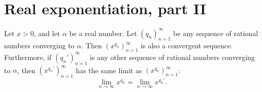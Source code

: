 \section{Real exponentiation, part II}\label{i:sec:6.7}

\begin{lem}\label{i:6.7.1}
  Let \(x > 0\), and let \(\alpha\) be a real number.
  Let \((q_n)_{n = 1}^\infty\) be any sequence of rational numbers converging to \(\alpha\).
  Then \((x^{q_n})_{n = 1}^\infty\) is also a convergent sequence.
  Furthermore, if \((q_n')_{n = 1}^\infty\) is any other sequence of rational numbers converging to \(\alpha\), then \((x^{q_n'})_{n = 1}^\infty\) has the same limit as \((x^{q_n})_{n = 1}^\infty\):
  \[
    \lim_{n \to \infty} x^{q_n} = \lim_{n \to \infty} x^{q_n'}.
  \]
\end{lem}

